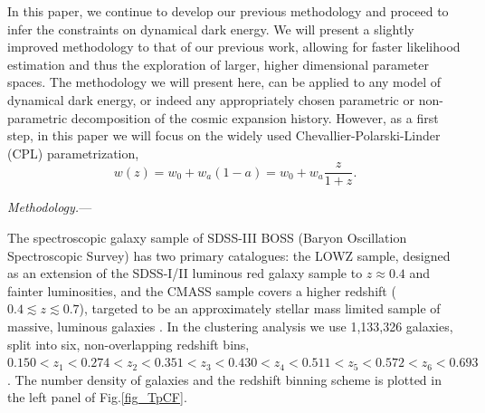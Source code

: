 \documentclass[prl,twocolumn,superscriptaddress,aps,amsmath,amssymb,nofootinbib,altaffilletter]{revtex4}
\begin{document}
In this paper, we continue to develop our previous methodology and proceed to infer the constraints on dynamical dark energy. 
We will present a slightly improved methodology to that of our previous work\citep{Li2016}, 
allowing for faster likelihood estimation and thus the exploration of larger, higher dimensional parameter spaces. 
The methodology we will present here, can be applied to any model of dynamical dark energy, 
or indeed any appropriately chosen parametric or non-parametric decomposition of the cosmic expansion history. 
However, as a first step, in this paper we will focus on the widely used Chevallier-Polarski-Linder (CPL) parametrization\cite{CPL_CP,CPL_L},
\begin{equation}
w(z) = w_0 + w_a (1-a) = w_0 + w_a \frac{z}{1+z}.
\end{equation}





{\it Methodology.}---

The spectroscopic galaxy sample of SDSS-III BOSS (Baryon Oscillation Spectroscopic Survey) has two primary catalogues:
the LOWZ sample, designed as an extension of the SDSS-I/II luminous red galaxy sample to $z\approx 0.4$ and fainter luminosities,
and the CMASS sample covers a higher redshift ($0.4\lesssim z \lesssim 0.7$),
targeted to be an approximately stellar mass limited sample of massive, luminous galaxies \cite{Reidetal:2016}.
In the clustering analysis we use 1,133,326 galaxies, split into six, non-overlapping redshift bins, 
$0.150<z_1<0.274<z_2<0.351<z_3<0.430<z_4<0.511<z_5<0.572<z_6<0.693$.
The number density of galaxies and the redshift binning scheme is plotted in the left panel of Fig.\ref{fig_TpCF}.
\end{document}
